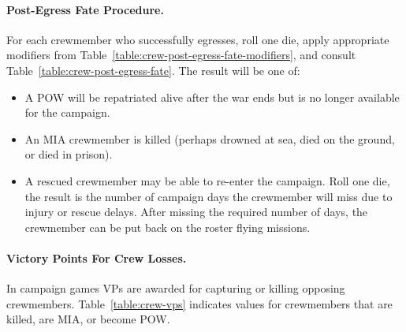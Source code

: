 \begin{advancedrules}
{\paragraph{Post-Egress Fate Procedure.\label{rule:post-egress-fate}} 
For each crewmember who successfully egresses, roll one die, apply appropriate modifiers from Table~\ref{table:crew-post-egress-fate-modifiers}, and consult Table~\ref{table:crew-post-egress-fate}. The result will be one of:

\begin{itemize}
    \item {} A POW will be repatriated alive after the war ends but is no longer available for the campaign.
    \item {} An MIA crewmember is killed (perhaps drowned at sea, died on the ground, or died in prison).
    \item {} A rescued crewmember may be able to re-enter the campaign. Roll one die, the result is the number of campaign days the crewmember will miss due to injury or rescue delays. After missing the required number of days, the crewmember can be put back on the roster flying missions.

\end{itemize}

\paragraph{Victory Points For Crew Losses.} In campaign games VPs are awarded for capturing or killing opposing crewmembers. Table~\ref{table:crew-vps} indicates values for crewmembers that are killed, are MIA, or become POW.
}

\end{advancedrules}
